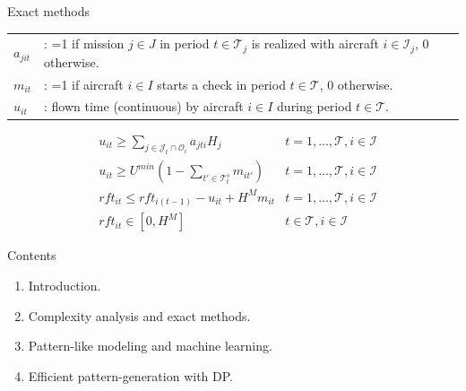 \documentclass[usenames,dvipsnames]{beamer}
\begin{document}
\begin{frame}

\begin{block}{Exact methods}

\begin{tabular}{p{15mm}p{110mm}}
  $a_{jit}$ &  :  =1 if mission $j \in J$ in period $t \in \mathcal{T}_j$ is realized with aircraft $i \in \mathcal{I}_j$, 0 otherwise.  \\
  $m_{it}$   & :  =1 if aircraft $i \in I$ starts a check in period $t \in \mathcal{T}$, 0 otherwise.  \\
  $u_{it}$    &:  flown time (continuous) by aircraft $i \in I$ during period $t \in \mathcal{T}$. \\
\end{tabular}

\begin{align}
 & u_{it} \geq \sum_{j \in \mathcal{J}_t \cap \mathcal{O}_i} a_{jti} H_j 
    & t =1, ..., \mathcal{T}, i \in \mathcal{I} \label{eq:flight1}\\
 & u_{it} \geq U^{min} (1 - \sum_{t' \in \mathcal{T}^s_t} m_{it'})
    & t =1, ..., \mathcal{T}, i \in \mathcal{I} \label{eq:flight2}\\
 & rft_{it} \leq rft_{i(t-1)} - u_{it} + H^M m_{it}
    & t =1, ..., \mathcal{T}, i \in \mathcal{I} \label{eq:first_rft_upper}\\
& rft_{it} \in [0,H^M]
      & t \in \mathcal{T}, i \in \mathcal{I} \label{eq:first-mu}
\end{align}

\end{block}

\begin{block}{Contents}

\begin{enumerate}[<+->]

\item
  Introduction.
\item
  Complexity analysis and exact methods.
\item
  Pattern-like modeling and machine learning.
\item
  Efficient pattern-generation with DP.
\end{enumerate}

\end{block}

\end{frame}
\end{document}

